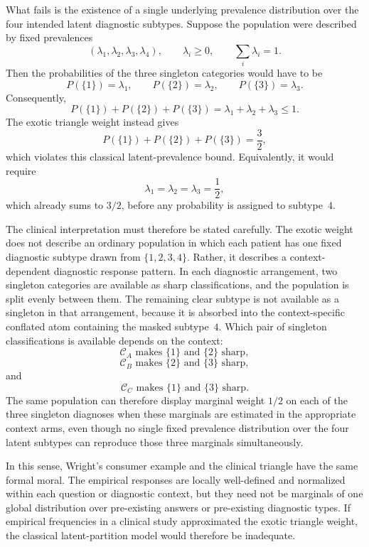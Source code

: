 \documentclass[aps,pra,twocolumn,superscriptaddress,floatfix,longbibliography]{revtex4-2}
\begin{document}
What fails is the existence of a single underlying prevalence
distribution over the four intended latent diagnostic subtypes.
Suppose the population were described by fixed prevalences
\[
(\lambda_1,\lambda_2,\lambda_3,\lambda_4),
\qquad
\lambda_i\geq 0,\qquad
\sum_i\lambda_i=1.
\]
Then the probabilities of the three singleton categories would have
to be
\[
P(\{1\})=\lambda_1,\qquad
P(\{2\})=\lambda_2,\qquad
P(\{3\})=\lambda_3.
\]
Consequently,
\[
P(\{1\})+P(\{2\})+P(\{3\})
=
\lambda_1+\lambda_2+\lambda_3
\leq 1.
\]
The exotic triangle weight instead gives
\[
P(\{1\})+P(\{2\})+P(\{3\})
=
\frac32,
\]
which violates this classical latent-prevalence bound. Equivalently,
it would require
\[
\lambda_1=\lambda_2=\lambda_3=\frac12,
\]
which already sums to \(3/2\), before any probability is assigned to
subtype~\(4\).

The clinical interpretation must therefore be stated carefully. The
exotic weight does not describe an ordinary population in which each
patient has one fixed diagnostic subtype drawn from
\(\{1,2,3,4\}\). Rather, it describes a context-dependent diagnostic
response pattern. In each diagnostic arrangement, two singleton
categories are available as sharp classifications, and the population
is split evenly between them. The remaining clear subtype is not
available as a singleton in that arrangement, because it is absorbed
into the context-specific conflated atom containing the masked
subtype~\(4\). Which pair of singleton classifications is available
depends on the context:
\[
\mathcal C_A \text{ makes } \{1\}\text{ and }\{2\}\text{ sharp},
\]
\[
\mathcal C_B \text{ makes } \{2\}\text{ and }\{3\}\text{ sharp},
\]
and
\[
\mathcal C_C \text{ makes } \{1\}\text{ and }\{3\}\text{ sharp}.
\]
The same population can therefore display marginal weight \(1/2\) on
each of the three singleton diagnoses when these marginals are
estimated in the appropriate context arms, even though no single
fixed prevalence distribution over the four latent subtypes can
reproduce those three marginals simultaneously.

In this sense, Wright's consumer example and the clinical triangle
have the same formal moral. The empirical responses are locally
well-defined and normalized within each question or diagnostic
context, but they need not be marginals of one global distribution
over pre-existing answers or pre-existing diagnostic types. If
empirical frequencies in a clinical study approximated the exotic
triangle weight, the classical latent-partition model would therefore
be inadequate.
\end{document}
